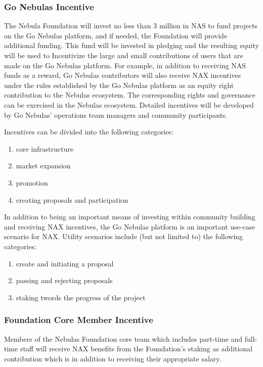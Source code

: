 \subsubsection{Go Nebulas Incentive}
The Nebula Foundation will invest no less than $3$ million in NAS to fund projects on the Go Nebulas platform, and if needed, the Foundation will provide additional funding. This fund will be invested in pledging and the resulting equity will be used to Incentivize the large and small contributions of users that are made on the Go Nebulas platform. For example, in addition to receiving NAS funds as a reward, Go Nebulas contributors will also receive NAX incentives under the rules established by the Go Nebulas platform as an equity right contribution to the Nebulas ecosystem. The corresponding rights and governance can be exercised in the Nebulas ecosystem. Detailed incentives will be developed by Go Nebulas' operations team managers and community participants.

Incentives can be divided into the following categories:
\begin{enumerate}[\hspace{1cm}(a)]
	\item core infrastructure
	\item market expansion
	\item promotion
	\item creating proposals and participation
\end{enumerate}

In addition to being an important means of investing within community building and receiving NAX incentives, the Go Nebulas platform is an important use-case scenario for NAX. Utility scenarios include (but not limited to) the following categories:
\begin{enumerate}[\hspace{1cm}(a)]
	\item create and initiating a proposal
	\item passing and rejecting proposals
	\item staking twords the progress of the project
\end{enumerate}

\subsubsection{Foundation Core Member Incentive}
Members of the Nebulas Foundation core team which includes part-time and full-time staff will receive NAX benefits from the Foundation's staking as additional contribution which is in addition to receiving their appropriate salary.

